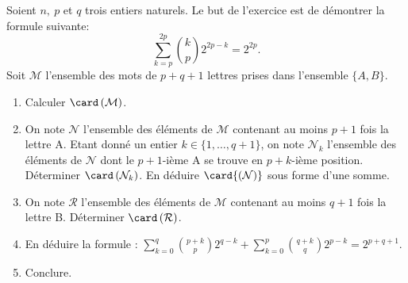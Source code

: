 \documentclass[a4paper, 11pt]{article}
\begin{document}
\begin{exercice}  \;
	Soient $n,\ p$ et $q$ trois entiers naturels. Le but de l'exercice est de d\'emontrer la formule suivante:
	$$\sum\limits_{k=p}^{2p} \binom{k}{p}2^{2p-k}=2^{2p}.$$
	Soit $\mathcal{M}$ l'ensemble des mots de $p+q+1$ lettres prises dans l'ensemble $\lbrace A,B\rbrace$.
	\begin{enumerate}
		\item Calculer $\card\left( \mathcal{M}\right)$.
		\item On note $\mathcal{N}$ l'ensemble des \'el\'ements de $\mathcal{M}$ contenant au moins $p+1$ fois la lettre A. Etant donn\'e un entier $k\in\lbrace 1,\dots,q+1\rbrace$, on note $\mathcal{N}_k$ l'ensemble des \'el\'ements de $\mathcal{N}$ dont le $p+1$-i\`eme A se trouve en $p+k$-i\`eme position. D\'eterminer $\card\left( \mathcal{N}_k\right)$. En d\'eduire $\card{\left( \mathcal{N}\right)}$ sous forme d'une somme.
		\item On note $\mathcal{R}$ l'ensemble des \'el\'ements de $\mathcal{M}$ contenant au moins $q+1$ fois la lettre B. D\'eterminer $\card\left(\mathcal{R} \right)$.
		\item En d\'eduire la formule : $\sum\limits_{k=0}^q \binom{p+k}{p} 2^{q-k}+\sum\limits_{k=0}^p \binom{q+k}{q} 2^{p-k}=2^{p+q+1}.$
		\item Conclure.
	\end{enumerate}
\end{exercice}
\end{document}
